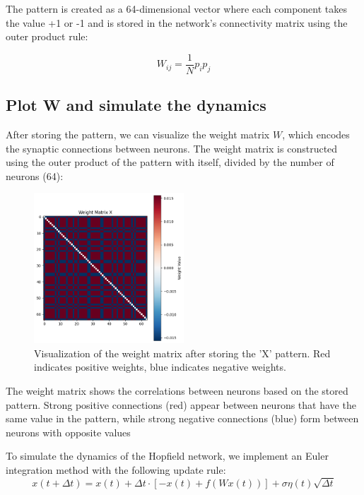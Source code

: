 \documentclass{article}
\begin{document}
The pattern is created as a 64-dimensional vector where each component takes the value +1 or -1 and is stored in the network's connectivity matrix using the outer product rule:

\begin{equation}
W_{ij} = \frac{1}{N}p_i p_j
\end{equation}

\subsection{Plot W and simulate the dynamics}
After storing the pattern, we can visualize the weight matrix $W$, which encodes the synaptic connections between neurons. The weight matrix is constructed using the outer product of the pattern with itself, divided by the number of neurons (64):

\begin{figure}[H]
\centering
\includegraphics[width=0.5\textwidth]{Weight Matrix X.png}
\caption{Visualization of the weight matrix after storing the 'X' pattern. Red indicates positive weights, blue indicates negative weights.}
\label{fig:weight_matrix}
\end{figure}

The weight matrix shows the correlations between neurons based on the stored pattern. Strong positive connections (red) appear between neurons that have the same value in the pattern, while strong negative connections (blue) form between neurons with opposite values

To simulate the dynamics of the Hopfield network, we implement an Euler integration method with the following update rule:
\begin{equation}
x(t+\Delta t) = x(t) + \Delta t \cdot [-x(t) + f(Wx(t))] + \sigma\eta(t)\sqrt{\Delta t}
\end{equation}
\end{document}
